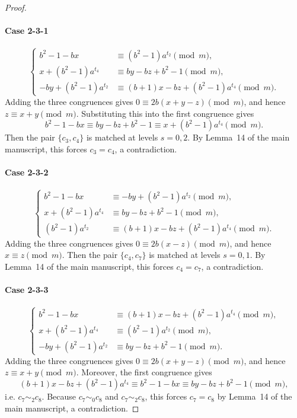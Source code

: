 \documentclass[11pt]{article}
\newcommand{\mymod}{\pmod{m}}
\begin{document}
\begin{proof}
\paragraph{Case 2-3-1}
$$
\begin{cases}
	b^2-1-bx &\equiv (b^2-1)a^{t_2}\mymod, \\
	x+(b^2-1)a^{t_4} &\equiv by-bz+b^2-1\mymod, \\
	-by+(b^2-1)a^{t_2} &\equiv (b+1)x-bz+(b^2-1)a^{t_4}\mymod.
\end{cases}
$$
Adding the three congruences gives $0\equiv2b(x+y-z)\mymod$, and hence $z\equiv x+y\mymod$. 
Substituting this into the first congruence gives
$$
b^2-1-bx\equiv by-bz+b^2-1\equiv x+(b^2-1)a^{t_4}\mymod.
$$
Then the pair $\{c_3,c_4\}$ is matched at levels $s=0,2$. By
Lemma~14 of the main manuscript, this forces $c_3=c_4$, a contradiction.

\paragraph{Case 2-3-2}
$$
\begin{cases}
	b^2-1-bx &\equiv -by+(b^2-1)a^{t_2}\mymod, \\
	x+(b^2-1)a^{t_4} &\equiv by-bz+b^2-1\mymod, \\
	(b^2-1)a^{t_2}&\equiv (b+1)x-bz+(b^2-1)a^{t_4}\mymod.
\end{cases}
$$
Adding the three congruences gives $0\equiv2b(x-z)\mymod$, and hence
$x\equiv z\mymod$. 
Then the pair $\{c_4,c_7\}$ is matched at levels $s=0,1$. By Lemma~14 of the main manuscript, this forces $c_4=c_7$, a contradiction.

\paragraph{Case 2-3-3}
$$
\begin{cases}
	b^2-1-bx &\equiv (b+1)x-bz+(b^2-1)a^{t_4}\mymod,\\
	 x+(b^2-1)a^{t_4}&\equiv (b^2-1)a^{t_2}\mymod,\\
	-by+(b^2-1)a^{t_2} &\equiv by-bz+b^2-1\mymod.
\end{cases}
$$
Adding the three congruences gives $0\equiv2b(x+y-z)\mymod$, and hence $z\equiv x+y\mymod$. Moreover, the first congruence gives
$$
(b+1)x-bz+(b^2-1)a^{t_4}
\equiv b^2-1-bx
\equiv by-bz+b^2-1\mymod,
$$
i.e. $c_7\sim_2 c_8$.
Because $c_7\sim_0 c_8$ and $c_7\sim_2 c_8$, this forces $c_7=c_8$ by Lemma~14 of the main manuscript, a contradiction.


\end{proof}
\end{document}
